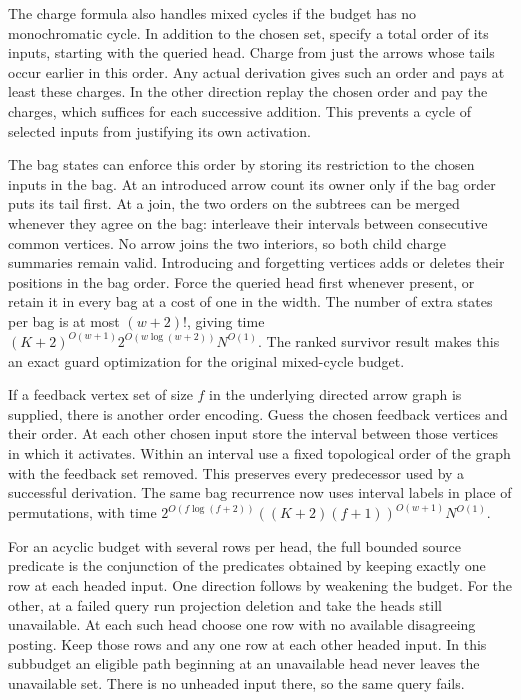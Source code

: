 The charge formula also handles mixed cycles if the
budget has no monochromatic cycle. In addition to the
chosen set, specify a total order of its inputs, starting
with the queried head. Charge from just the arrows whose
tails occur earlier in this order. Any actual derivation
gives such an order and pays at least these charges. In
the other direction replay the chosen order and pay the
charges, which suffices for each successive addition.
This prevents a cycle of selected inputs from justifying
its own activation.

The bag states can enforce this order by storing its
restriction to the chosen inputs in the bag. At an
introduced arrow count its owner only if the bag order
puts its tail first. At a join, the two orders on the
subtrees can be merged whenever they agree on the bag:
interleave their intervals between consecutive common
vertices. No arrow joins the two interiors, so both
child charge summaries remain valid. Introducing and
forgetting vertices adds or deletes their positions in
the bag order. Force the queried head first whenever
present, or retain it in every bag at a cost of one in
the width. The number of extra states per bag is at
most $(w+2)!$, giving time
$(K+2)^{O(w+1)}2^{O(w\log(w+2))}N^{O(1)}$.
The ranked survivor result makes this an exact guard
optimization for the original mixed-cycle budget.

If a feedback vertex set of size $f$ in the underlying
directed arrow graph is supplied, there is another
order encoding. Guess the chosen feedback vertices
and their order. At each other chosen input store the
interval between those vertices in which it activates.
Within an interval use a fixed topological order of the
graph with the feedback set removed. This preserves
every predecessor used by a successful derivation.
The same bag recurrence now uses interval labels in
place of permutations, with time
$2^{O(f\log(f+2))}((K+2)(f+1))^{O(w+1)}N^{O(1)}$.

For an acyclic budget with several rows per head,
the full bounded source predicate is the conjunction
of the predicates obtained by keeping exactly one
row at each headed input. One direction follows
by weakening the budget. For the other, at a
failed query run projection deletion and take
the heads still unavailable. At each such head
choose one row with no available disagreeing
posting. Keep those rows and any one row at
each other headed input. In this subbudget an
eligible path beginning at an unavailable head
never leaves the unavailable set. There is no
unheaded input there, so the same query fails.

